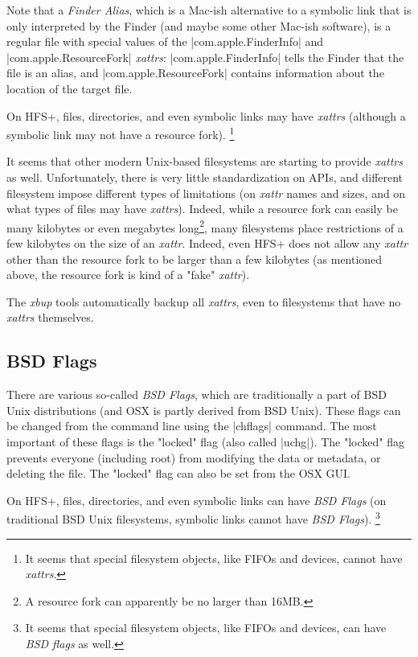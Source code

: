 \documentclass[11pt]{article}
\begin{document}
Note that a \emph{Finder Alias}, which is a Mac-ish alternative to
a symbolic link that is only interpreted by the Finder (and
maybe some other Mac-ish software), is a regular file
with special values of the |com.apple.FinderInfo| and  
|com.apple.ResourceFork| \emph{xattrs}: |com.apple.FinderInfo| tells
the Finder that the file is an alias, and |com.apple.ResourceFork|
contains information about the location of the target file.

On HFS+, files, directories, and even symbolic links may have
\emph{xattrs} (although a symbolic link may not have
a resource fork).%
\footnote{%
It seems that special filesystem objects, like FIFOs and devices,
cannot have \emph{xattrs}.}


It seems that other modern Unix-based filesystems are 
starting to provide \emph{xattrs} as well.
Unfortunately, there is very little standardization
on APIs, and different filesystem impose different types
of limitations (on \emph{xattr} names and sizes,
and on what types of files may have \emph{xattrs}).
Indeed, while a resource fork can easily be many kilobytes or
even megabytes long\footnote{A resource fork can apparently be
no larger than 16MB.}, many filesystems place restrictions
of a few kilobytes on the size of an \emph{xattr}.
Indeed, even HFS+ does not allow any \emph{xattr} other than
the resource fork to be larger than a few kilobytes
(as mentioned above, the resource fork is kind of a "fake" \emph{xattr}).

The \emph{xbup} tools automatically backup all \emph{xattrs},
even to filesystems that have no \emph{xattrs} themselves.

\subsection{BSD Flags}

There are various so-called \emph{BSD Flags},
which are traditionally a part of BSD Unix distributions
(and OSX is partly derived from BSD Unix).
These flags can be changed from the command line using the |chflags|
command.
The most important of these flags is the "locked" flag (also called
|uchg|).
The "locked" flag prevents everyone (including root)
from modifying the data or metadata, or deleting the file.
The "locked" flag can also be set from the OSX GUI.

On HFS+, files, directories, and even symbolic links can have
\emph{BSD Flags} (on traditional BSD Unix filesystems, 
symbolic links cannot have \emph{BSD Flags}).%
\footnote{%
It seems that special filesystem objects, like FIFOs and devices,
can have \emph{BSD flags} as well.}
\end{document}
